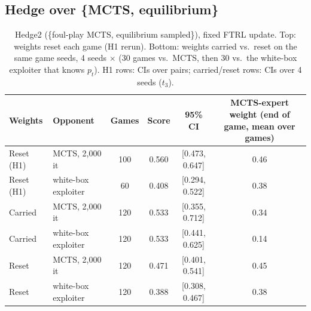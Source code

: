 \documentclass[10pt]{article}
\theoremstyle{plain}
\theoremstyle{definition}
\theoremstyle{remark}
\begin{document}
\subsection{Hedge over \{MCTS, equilibrium\}}
\label{sec:exp-hedge}
\begin{table}[h]
\centering\small
\caption{Hedge2 (\{foul-play MCTS, equilibrium sampled\}), fixed FTRL update. Top: weights reset each game (H1 rerun). Bottom: weights carried vs.\ reset on the same game seeds, 4 seeds $\times$ (30 games vs.\ MCTS, then 30 vs.\ the white-box exploiter that knows $p_t$). H1 rows: CIs over pairs; carried/reset rows: CIs over 4 seeds ($t_3$).}
\label{tab:hedge}
\begin{tabular}{@{}llcccc@{}}
\toprule
Weights & Opponent & Games & Score & 95\% CI & MCTS-expert weight (end of game, mean over games) \\
\midrule
Reset (H1) & MCTS, 2,000 it & 100 & 0.560 & [0.473, 0.647] & 0.46 \\
Reset (H1) & white-box exploiter & 60 & 0.408 & [0.294, 0.522] & 0.38 \\
\midrule
Carried & MCTS, 2,000 it & 120 & 0.533 & [0.355, 0.712] & 0.34 \\
Carried & white-box exploiter & 120 & 0.533 & [0.441, 0.625] & 0.14 \\
Reset & MCTS, 2,000 it & 120 & 0.471 & [0.401, 0.541] & 0.45 \\
Reset & white-box exploiter & 120 & 0.388 & [0.308, 0.467] & 0.38 \\
\bottomrule
\end{tabular}
\vspace{-0.6em}
\end{table}
\end{document}
